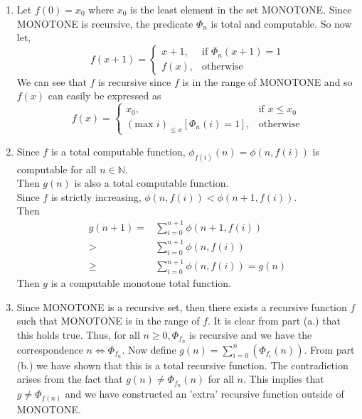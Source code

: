 \documentclass{assignment}
\begin{document}
\begin{problemlist}

  \pbitem
  \begin{problem}
  \end{problem}
  \begin{answer}
    \begin{enumerate}    
    \item
      Let $f(0) = x_{0}$ where $x_{0}$ is the least element in the set MONOTONE. Since MONOTONE is recursive, the predicate $\Phi_{n}$ is total and computable.
      So now let, 
      \[
      f(x+1) =
      \begin{cases}
    	x+1, 		& \text{if } \Phi_{n}(x+1) = 1\\
    	f(x)	,		& \text{otherwise}
      \end{cases}
      \]
      We can see that $f$ is recursive since $f$ is in the range of MONOTONE and so $f(x)$ can easily be expressed as
      \[
      f(x) =
      \begin{cases}
    	x_{0}, 		& \text{if } x \leq x_{0}\\
    	(\text{max } i)_{\leq x}[\Phi_{n}(i) = 1],		& \text{otherwise}
      \end{cases}
      \]
      \bigskip
    \item
      Since $f$ is a total computable function, $\phi_{f(i)}(n)=\phi(n,f(i))$ is computable for all $n\in \mathbb{N}$.\\
      Then $g(n)$ is also a total computable function.\\
      Since $f$ is strictly increasing, $\phi(n,f(i))<\phi(n+1,f(i))$.\\
      Then
      \begin{align*}
        g(n+1)=&\sum_{i=0}^{n+1}\phi(n+1,f(i))\\
        >& \sum_{i=0}^{n+1}\phi(n,f(i))\\
        \ge& \sum_{i=0}^{n+1}\phi(n,f(i))=g(n)
      \end{align*}
      Then $g$ is a computable monotone total function.\\
    \item
      Since MONOTONE is a recursive set, then there exists a recursive function $f$ such that MONOTONE is in the range of $f$. It is clear from part (a.) that this holds true. Thus, for all $n \geq 0, \Phi_{f_{n}}$ is recursive and we have the correspondence $ n \Leftrightarrow \Phi_{f_{n}}$. Now define $g(n) = \sum_{i=0}^{n} (\Phi_{f_{i}}(n))$. From part (b.) we have shown that this is a total recursive function. The contradiction arises from the fact that $g(n) \neq \Phi_{f_{n}}(n)$ for all $n$. This implies that $g \neq \Phi_{f(n)}$ and we have constructed an 'extra' recursive function outside of MONOTONE.
    \end{enumerate}
  \end{answer}
  

\end{problemlist}
\end{document}
